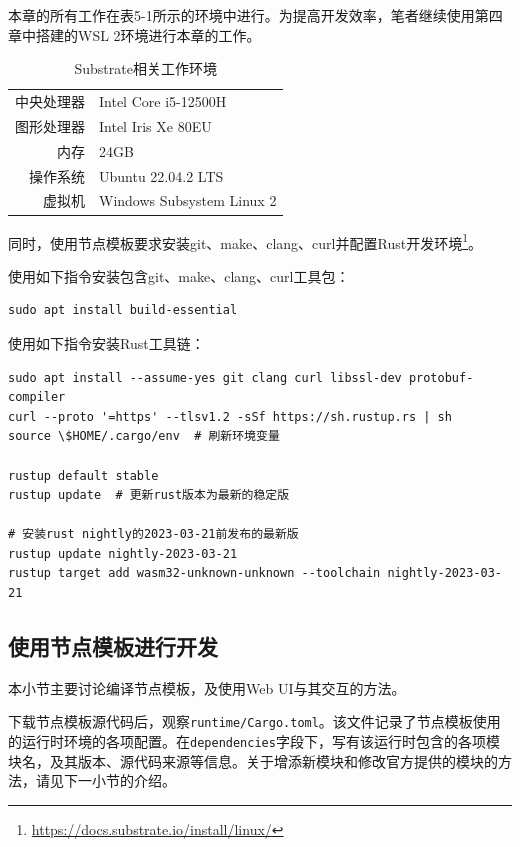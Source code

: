 本章的所有工作在表5-1所示的环境中进行。为提高开发效率，笔者继续使用第四章中搭建的WSL 2环境进行本章的工作。

\begin{table}[htbp]
    \linespread{1.5}
    \centering
    \caption{Substrate相关工作环境}\label{Substrate相关工作环境}
    \begin{tabular}{r|l} \toprule
        中央处理器 & Intel Core i5-12500H      \\
        图形处理器 & Intel Iris Xe 80EU        \\
        内存    & 24GB                      \\
        操作系统  & Ubuntu 22.04.2 LTS        \\
        虚拟机   & Windows Subsystem Linux 2 \\
        \bottomrule
    \end{tabular}
\end{table}

同时，使用节点模板要求安装git、make、clang、curl并配置Rust开发环境\footnote{\url{https://docs.substrate.io/install/linux/}}。

使用如下指令安装包含git、make、clang、curl工具包：

\begin{lstlisting}[caption={安装工具包}, label={lst:安装工具包}]
sudo apt install build-essential
\end{lstlisting}

使用如下指令安装Rust工具链：

\begin{lstlisting}[caption={安装Rust工具链}, label={lst:安装Rust工具链}]
sudo apt install --assume-yes git clang curl libssl-dev protobuf-compiler
curl --proto '=https' --tlsv1.2 -sSf https://sh.rustup.rs | sh
source \$HOME/.cargo/env  # 刷新环境变量

rustup default stable
rustup update  # 更新rust版本为最新的稳定版

# 安装rust nightly的2023-03-21前发布的最新版
rustup update nightly-2023-03-21
rustup target add wasm32-unknown-unknown --toolchain nightly-2023-03-21
\end{lstlisting}

\subsection{使用节点模板进行开发}

本小节主要讨论编译节点模板，及使用Web UI与其交互的方法。

下载节点模板源代码后，观察\verb|runtime/Cargo.toml|。该文件记录了节点模板使用的运行时环境的各项配置。在\verb|dependencies|字段下，写有该运行时包含的各项模块名，及其版本、源代码来源等信息。关于增添新模块和修改官方提供的模块的方法，请见下一小节的介绍。

